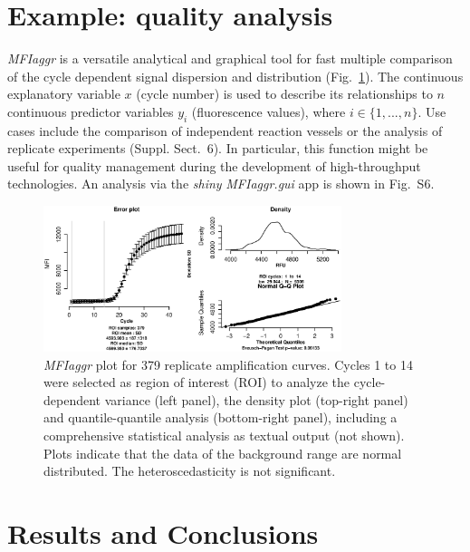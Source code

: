 \documentclass{bioinfo}
\begin{document}
\section{Example: quality analysis}

\textsl{MFIaggr} is a versatile analytical and graphical tool for fast multiple 
comparison of the cycle dependent signal dispersion and distribution 
(Fig.~\ref{fig:01}). The continuous explanatory variable $x$ (cycle number) is 
used to describe its relationships to $n$ continuous predictor variables $y_i$ 
(fluorescence values), where $i \in \{1, ..., n\}$. Use cases include the 
comparison of independent reaction vessels or 
the analysis of replicate experiments (Suppl. Sect.~6). In %
particular, this function might be useful for quality management during the 
development of high-throughput technologies. An analysis via the \emph{shiny} 
\textsl{MFIaggr.gui} app is shown in Fig.~S6. %

\begin{figure}[!tpb]%
\centerline{\includegraphics[width=8.7cm]{fig01.eps}}
\caption{\textsl{MFIaggr} plot for 379 replicate amplification curves. Cycles 1 to 14 were 
selected as region of interest (ROI) to analyze the 
cycle-dependent variance (left panel), the density plot (top-right 
panel) and quantile-quantile analysis (bottom-right panel), including a 
comprehensive statistical analysis as textual output (not shown). Plots 
indicate that the data of the background range are normal 
distributed. The heteroscedasticity is not significant.}\label{fig:01}
\end{figure}
\section{Results and Conclusions}
\end{document}
